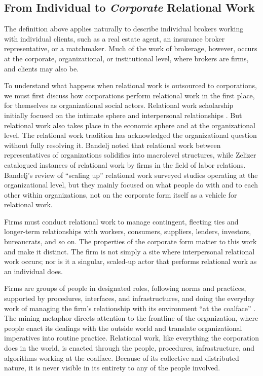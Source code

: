 \documentclass[
]{article}
\begin{document}
\subsection{\texorpdfstring{From Individual to \emph{Corporate} Relational Work}{From Individual to Corporate Relational Work}}

The definition above applies naturally to describe individual brokers working with individual clients, such as a real estate agent, an insurance broker representative, or a matchmaker. Much of the work of brokerage, however, occurs at the corporate, organizational, or institutional level, where brokers are firms, and clients may also be.

To understand what happens when relational work is outsourced to corporations, we must first discuss how corporations perform relational work in the first place, for themselves as organizational social actors. Relational work scholarship initially focused on the intimate sphere and interpersonal relationships \autocite[for a review, see][]{bandeljRelationalWorkEconomy2020}. But relational work also takes place in the economic sphere and at the organizational level. The relational work tradition has acknowledged the organizational question without fully resolving it. Bandelj \autocite*{bandeljRelationalWorkEconomic2012} noted that relational work between representatives of organizations solidifies into macrolevel structures, while Zelizer \autocite*[156-157]{zelizerHowBecameRelational2012} catalogued instances of relational work by firms in the field of labor relations. Bandelj's \autocite*{bandeljRelationalWorkEconomy2020} review of ``scaling up'' relational work surveyed studies operating at the organizational level, but they mainly focused on what people do with and to each other within organizations, not on the corporate form itself as a vehicle for relational work.

Firms must conduct relational work to manage contingent, fleeting ties and longer-term relationships with workers, consumers, suppliers, lenders, investors, bureaucrats, and so on. The properties of the corporate form matter to this work and make it distinct. The firm is not simply a site where interpersonal relational work occurs; nor is it a singular, scaled-up actor that performs relational work as an individual does.

Firms are groups of people in designated roles, following norms and practices, supported by procedures, interfaces, and infrastructures, and doing the everyday work of managing the firm's relationship with its environment ``at the coalface'' \autocite{grayGoverningOrganizationInterpreting2014,huisingNudgeCultureBack2018}. The mining metaphor directs attention to the frontline of the organization, where people enact its dealings with the outside world and translate organizational imperatives into routine practice. Relational work, like everything the corporation does in the world, is enacted through the people, procedures, infrastructure, and algorithms working at the coalface. Because of its collective and distributed nature, it is never visible in its entirety to any of the people involved.
\end{document}
